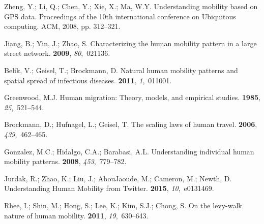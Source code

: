 \documentclass[ijgi,article,accept,moreauthors,pdftex,10pt,a4paper]{mdpi}
\theoremstyle{mdpi}
\newcounter{ex}
\newcounter{re}
\theoremstyle{mdpidefinition}
\providecommand{\DIFdelbegin}{} %
\providecommand{\DIFdelend}{} %
\begin{document}
\renewcommand\bibname{References}
\begin{thebibliography}{-------}
\DIFdelbegin %
\DIFdelend \providecommand{\natexlab}[1]{#1}

Zheng, Y.; Li, Q.; Chen, Y.; Xie, X.; Ma, W.Y.
\newblock Understanding mobility based on GPS data.
\newblock  Proceedings of the 10th international conference on Ubiquitous
  computing. ACM,  2008, pp. 312--321.

Jiang, B.; Yin, J.; Zhao, S.
\newblock Characterizing the human mobility pattern in a large street network.
 {\bf 2009}, {\em 80},~021136.

Belik, V.; Geisel, T.; Brockmann, D.
\newblock Natural human mobility patterns and spatial spread of infectious
  diseases.
 {\bf 2011}, {\em 1},~011001.

Greenwood, M.J.
\newblock Human migration: Theory, models, and empirical studies.
 {\bf 1985}, {\em 25},~521--544.

Brockmann, D.; Hufnagel, L.; Geisel, T.
\newblock The scaling laws of human travel.
 {\bf 2006}, {\em 439},~462--465.

Gonzalez, M.C.; Hidalgo, C.A.; Barabasi, A.L.
\newblock Understanding individual human mobility patterns.
 {\bf 2008}, {\em 453},~779--782.

Jurdak, R.; Zhao, K.; Liu, J.; AbouJaoude, M.; Cameron, M.; Newth, D.
\newblock Understanding Human Mobility from Twitter.
 {\bf 2015}, {\em 10},~e0131469.

Rhee, I.; Shin, M.; Hong, S.; Lee, K.; Kim, S.J.; Chong, S.
\newblock On the levy-walk nature of human mobility.
 {\bf 2011}, {\em
  19},~630--643.


\end{thebibliography}
\end{document}
